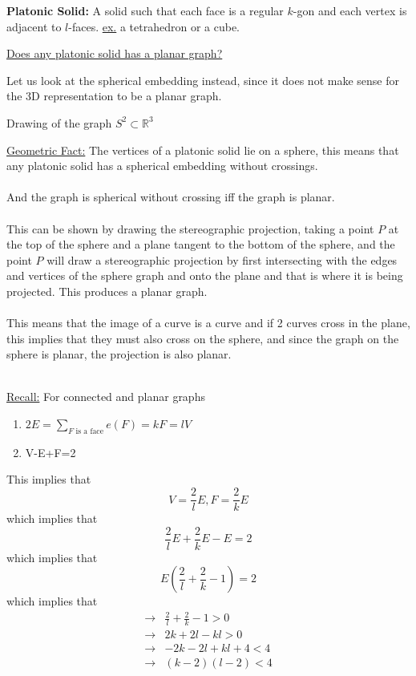 \documentclass[12pt]{article}
\begin{document}
\textbf{Platonic Solid:} A solid such that each face is a regular $k$-gon and each vertex is adjacent to $l$-faces. \underline{ex.} a tetrahedron or a cube.

\underline{Does any platonic solid has a planar graph?}

Let us look at the spherical embedding instead, since it does not make sense for the 3D representation to be a planar graph.

\begin{tcolorbox}[title=Definition: Spherical Embedding]
	Drawing of the graph $S^2 \subset \mathbb{R}^3$
\end{tcolorbox}

\underline{Geometric Fact:} The vertices of a platonic solid lie on a sphere, this means that any platonic solid has a spherical embedding without crossings.\\
\\
And the graph is spherical without crossing iff the graph is planar.\\
\\
This can be shown by drawing the stereographic projection, taking a point $P$ at the top of the sphere and a plane tangent to the bottom of the sphere, and the point $P$ will draw a stereographic projection by first intersecting with the edges and vertices of the sphere graph and onto the plane and that is where it is being projected. This produces a planar graph.\\
\\
This means that the image of a curve is a curve and if 2 curves cross in the plane, this implies that they must also cross on the sphere, and since the graph on the sphere is planar, the projection is also planar.\\
\\
\begin{tcolorbox}
	\underline{Recall:} For connected and planar graphs
	\begin{enumerate}
		\item{$2E = \sum_{F \text{ is a face}} e(F) = kF = lV$}
		\item{V-E+F=2}
	\end{enumerate}
\end{tcolorbox}

This implies that $$V = \frac{2}{l} E, F = \frac{2}{k} E$$ which implies that $$\frac{2}{l} E + \frac{2}{k} E - E = 2$$ which implies that $$E(\frac{2}{l} + \frac{2}{k} - 1) = 2$$ which implies that
\begin{align*}
	\longrightarrow& \frac{2}{l} + \frac{2}{k} - 1 > 0\\
	\longrightarrow& 2k +2l - kl > 0\\
	\longrightarrow& -2k -2l  + kl + 4 < 4\\
	\longrightarrow& (k-2)(l-2) < 4
\end{align*}
\end{document}
